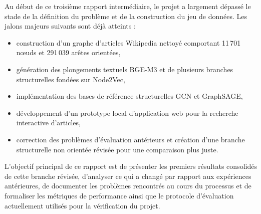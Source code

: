 Au début de ce troisième rapport intermédiaire, le projet a largement dépassé
le stade de la définition du problème et de la construction du jeu de données.
Les jalons majeurs suivants sont déjà atteints :
\begin{itemize}
    \item construction d'un graphe d'articles Wikipedia nettoyé comportant
    11\,701 nœuds et 291\,039 arêtes orientées,
    \item génération des plongements textuels BGE-M3 et de plusieurs branches
    structurelles fondées sur Node2Vec,
    \item implémentation des bases de référence structurelles GCN et
    GraphSAGE,
    \item développement d'un prototype local d'application web pour la
    recherche interactive d'articles,
    \item correction des problèmes d'évaluation antérieurs et création d'une
    branche structurelle non orientée révisée pour une comparaison plus juste.
\end{itemize}

L'objectif principal de ce rapport est de présenter les premiers résultats
consolidés de cette branche révisée, d'analyser ce qui a changé par rapport
aux expériences antérieures, de documenter les problèmes rencontrés au cours
du processus et de formaliser les métriques de performance ainsi que le
protocole d'évaluation actuellement utilisés pour la vérification du projet.

